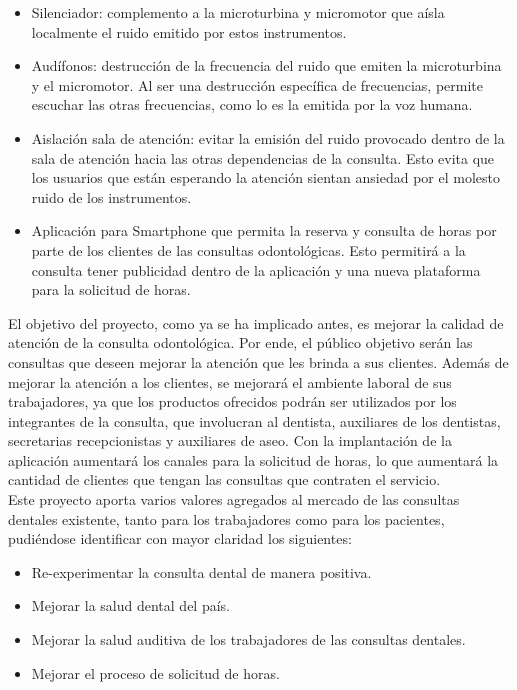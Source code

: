 \documentclass[letterpaper,12pt]{article}
\begin{document}
	\begin{itemize}
		\setlength{\itemsep}{0pt}%
		\setlength{\parskip}{0pt}%
		\item Silenciador: complemento a la microturbina y micromotor que aísla localmente el ruido emitido por estos instrumentos.
		\item Audífonos: destrucción de la frecuencia del ruido que emiten la microturbina y el micromotor. Al ser una destrucción específica de frecuencias, permite escuchar las otras frecuencias, como lo es la emitida por la voz humana.
		\item Aislación sala de atención: evitar la emisión del ruido provocado dentro de la sala de atención hacia las otras dependencias de la consulta. Esto evita que los usuarios que están esperando la atención sientan ansiedad por el molesto ruido de los instrumentos.
		\item Aplicación para Smartphone que permita la reserva y consulta de horas por parte de los clientes de las consultas odontológicas. Esto permitirá a la consulta tener publicidad dentro de la aplicación y una nueva plataforma para la solicitud de horas.
	\end{itemize}

\indent El objetivo del proyecto, como ya se ha implicado antes, es mejorar la calidad de atención de
la consulta odontológica. Por ende, el público objetivo serán las consultas que deseen mejorar la 
atención que les brinda a sus clientes. Además de mejorar la atención a los clientes, se mejorará el 
ambiente laboral de sus trabajadores, ya que los productos ofrecidos podrán ser utilizados por los 
integrantes de la consulta, que involucran al dentista, auxiliares de los dentistas, secretarias 
recepcionistas y auxiliares de aseo. Con la implantación de la aplicación aumentará los canales para 
la solicitud de horas, lo que aumentará la cantidad de clientes que tengan las consultas que 
contraten el servicio.
\\[0.5cm]
\indent Este proyecto aporta varios valores agregados al mercado de las consultas dentales
existente, tanto para los trabajadores como para los pacientes, pudiéndose identificar con mayor 
claridad los siguientes:
	\begin{itemize}
		\setlength{\itemsep}{0pt}%
		\setlength{\parskip}{0pt}%
		\item Re-experimentar la consulta dental de manera positiva.
		\item Mejorar la salud dental del país.
		\item Mejorar la salud auditiva de los trabajadores de las consultas dentales.
		\item Mejorar el proceso de solicitud de horas.
	\end{itemize}
\end{document}
